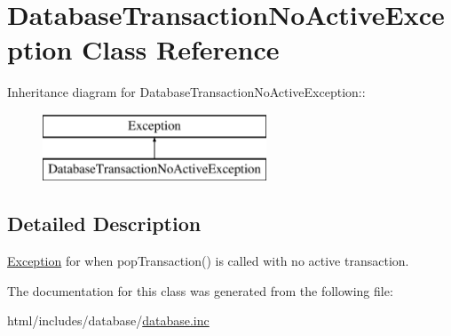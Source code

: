\hypertarget{classDatabaseTransactionNoActiveException}{
\section{DatabaseTransactionNoActiveException Class Reference}
\label{classDatabaseTransactionNoActiveException}
}
Inheritance diagram for DatabaseTransactionNoActiveException::\begin{figure}[H]
\begin{center}
\leavevmode
\includegraphics[height=2cm]{classDatabaseTransactionNoActiveException}
\end{center}
\end{figure}


\subsection{Detailed Description}
\hyperlink{classException}{Exception} for when popTransaction() is called with no active transaction. 

The documentation for this class was generated from the following file:\begin{DoxyCompactItemize}
\item 
html/includes/database/\hyperlink{database_8inc}{database.inc}\end{DoxyCompactItemize}
